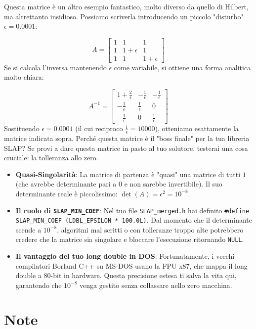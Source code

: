 \documentclass[10pt]{article}
\begin{document}
Questa matrice è un altro esempio fantastico, molto diverso da quello di Hilbert, ma altrettanto insidioso. Possiamo scriverla introducendo un piccolo "disturbo" $\epsilon = 0.0001$:

$$A = \begin{bmatrix} 1 & 1 & 1 \\ 1 & 1 + \epsilon & 1 \\ 1 & 1 & 1 + \epsilon \end{bmatrix}$$
Se si calcola l'inversa mantenendo $\epsilon$ come variabile, si ottiene una forma analitica molto chiara:

$$A^{-1} = \begin{bmatrix} 1 + \frac{2}{\epsilon} & -\frac{1}{\epsilon} & -\frac{1}{\epsilon} \\ -\frac{1}{\epsilon} & \frac{1}{\epsilon} & 0 \\ -\frac{1}{\epsilon} & 0 & \frac{1}{\epsilon} \end{bmatrix}$$
Sostituendo $\epsilon = 0.0001$ (il cui reciproco $\frac{1}{\epsilon} = 10000$), otteniamo esattamente la matrice indicata sopra.
Perché questa matrice è il "boss finale" per la tua libreria SLAP?
Se provi a dare questa matrice in pasto al tuo solutore, testerai una cosa cruciale: la tolleranza allo zero.
\begin{itemize}
\item \textbf{Quasi-Singolarità}: La matrice di partenza è "quasi" una matrice di tutti $1$ (che avrebbe determinante pari a $0$ e non sarebbe invertibile). Il suo determinante reale è piccolissimo: $\det(A) = \epsilon^2 = 10^{-8}$.
\item \textbf{Il ruolo di \texttt{SLAP\_MIN\_COEF}}: Nel tuo file \texttt{SLAP\_merged.h} hai definito \verb^#define SLAP_MIN_COEF (LDBL_EPSILON * 100.0L)^. Dal momento che il determinante scende a $10^{-8}$, algoritmi mal scritti o con tolleranze troppo alte potrebbero credere che la matrice sia singolare e bloccare l'esecuzione ritornando \texttt{NULL}.
\item \textbf{Il vantaggio del tuo long double in DOS}: Fortunatamente, i vecchi compilatori Borland C++ su MS-DOS usano la FPU x87, che mappa il long double a 80-bit in hardware. Questa precisione estesa ti salva la vita qui, garantendo che $10^{-8}$ venga gestito senza collassare nello zero macchina.
\end{itemize}




\section{Note}
\end{document}
